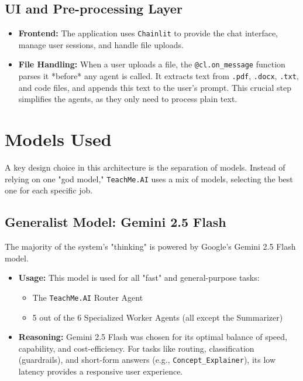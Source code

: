 \documentclass{article}
\begin{document}
\subsection{UI and Pre-processing Layer}
\begin{itemize}
    \item \textbf{Frontend:} The application uses \texttt{Chainlit} to provide the chat interface, manage user sessions, and handle file uploads.
    \item \textbf{File Handling:} When a user uploads a file, the \texttt{@cl.on\_message} function parses it *before* any agent is called. It extracts text from \texttt{.pdf}, \texttt{.docx}, \texttt{.txt}, and code files, and appends this text to the user's prompt. This crucial step simplifies the agents, as they only need to process plain text.
\end{itemize}

\section{Models Used}
A key design choice in this architecture is the separation of models. Instead of relying on one "god model," \texttt{TeachMe.AI} uses a mix of models, selecting the best one for each specific job.

\subsection{Generalist Model: Gemini 2.5 Flash}
The majority of the system's "thinking" is powered by Google's Gemini 2.5 Flash model.
\begin{itemize}
    \item \textbf{Usage:} This model is used for all "fast" and general-purpose tasks:
        \begin{itemize}
            \item The \texttt{TeachMe.AI} Router Agent
    
            \item 5 out of the 6 Specialized Worker Agents (all except the Summarizer)
        \end{itemize}
    \item \textbf{Reasoning:} Gemini 2.5 Flash was chosen for its optimal balance of speed, capability, and cost-efficiency. For tasks like routing, classification (guardrails), and short-form answers (e.g., \texttt{Concept\_Explainer}), its low latency provides a responsive user experience.
\end{itemize}
\end{document}
